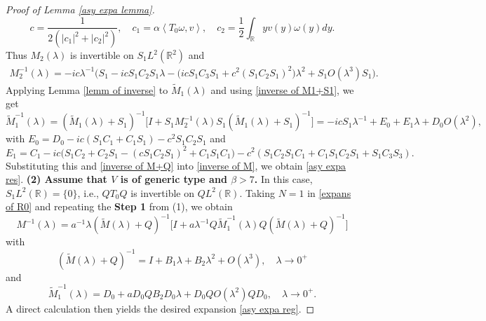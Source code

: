 \documentclass[reqno]{amsart}
\newcommand\R{\mathbb{R}}
\numberwithin{equation}{section}
\begin{document}
\begin{proof}[Proof of Lemma {\rm\ref{asy expa lemma}}]
\begin{equation}\label{c,c1,c2}
c=\frac{1}{2(|c_1|^2+|c_2|^2)},\quad c_1=\alpha \left<T_0\omega,v\right>,\quad c_2=\frac{1}{2}\int_{\R}yv(y)\omega(y)dy.
\end{equation}
Thus $M_2(\lambda)$ is invertible on $S_1L^2(\R^2)$ and 
\begin{align*}
    M^{-1}_2(\lambda)=-ic\lambda^{-1}\Big(S_1-icS_1C_2S_1\lambda-\big(icS_1C_3S_1+c^2(S_1C_2S_1)^2\big)\lambda^2 +S_1O(\lambda^3)S_1\Big).
\end{align*}
Applying Lemma \ref{lemm of inverse} to $\widetilde{M}_1(\lambda)$ and using \eqref{inverse of M1+S1}, we get 
\begin{equation*}
\widetilde{M}^{-1}_1(\lambda)=(\widetilde{M}_1(\lambda)+S_1)^{-1}\Big[I+S_1M^{-1}_2(\lambda)S_1(\widetilde{M}_1(\lambda)+S_1)^{-1}\Big]=-icS_1\lambda^{-1}+E_0+E_1\lambda+D_0O(\lambda^2),
\end{equation*}
with $E_0=D_0-ic(S_1C_1+C_1S_1)-c^2S_1C_2S_1$ and
\begin{equation*}
    E_1=C_1-ic\big(S_1C_2+C_2S_1-(cS_1C_2S_1)^2+C_1S_1C_1\big)-c^2(S_1C_2S_1C_1+C_1S_1C_2S_1+S_1C_3S_3).
\end{equation*}
Substituting this and \eqref{inverse of M+Q} into \eqref{inverse of M}, we obtain \eqref{asy expa res}.
\vskip0.3cm
{\bf (2) Assume that $V$ is of generic type and $\beta>7$.} In this case,  $S_1L^2(\R)=\{0\}$, i.e., $QT_0Q$ is invertible on $QL^2(\R)$. Taking $N=1$ in \eqref{expans of R0} and repeating the {\bf Step 1} from (1), we obtain 
\begin{equation*}
    M^{-1}(\lambda)=a^{-1}\lambda(\widetilde{M}(\lambda)+Q)^{-1}\Big[I+a\lambda^{-1}Q\widetilde{M}^{-1}_1(\lambda)Q(\widetilde{M}(\lambda)+Q)^{-1}\Big]
\end{equation*}
with  
\begin{equation*}
    (\widetilde{M}(\lambda)+Q)^{-1}=I+B_1\lambda+B_2\lambda^2
+O(\lambda^3),\quad \lambda
\rightarrow0^+
\end{equation*}
and 
\begin{equation*}
\widetilde{M}^{-1}_1(\lambda)=D_0+aD_0QB_2D_0\lambda+D_0QO(\lambda^2)QD_0,\quad \lambda
\rightarrow0^+. 
\end{equation*}
A direct calculation then yields the desired expansion \eqref{asy expa reg}.
\end{proof}
\end{document}
